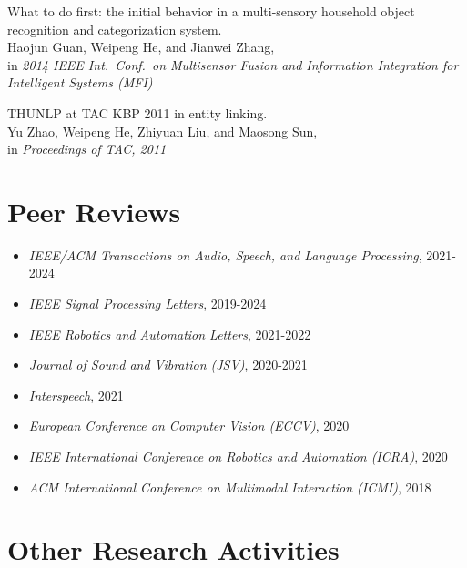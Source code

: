 \documentclass[a4paper,9pt]{extarticle} %
\begin{document}
\begin{enumerate}[label={[\arabic*]}]
  \item What to do first: the initial behavior in a multi-sensory household object recognition and categorization system. \\
        Haojun Guan, Weipeng He, and Jianwei Zhang, \\
        in \textit{2014 IEEE Int.\ Conf.\ on Multisensor Fusion and Information Integration for Intelligent Systems (MFI)}

  \item THUNLP at TAC KBP 2011 in entity linking. \\
        Yu Zhao, Weipeng He, Zhiyuan Liu, and Maosong Sun, \\
        in \textit{Proceedings of TAC, 2011}
\end{enumerate}


\section{Peer Reviews}

\begin{itemize}[itemsep=-.9em]
  \item \textit{IEEE/ACM Transactions on Audio, Speech, and Language Processing}, 2021-2024
  \item \textit{IEEE Signal Processing Letters}, 2019-2024
  \item \textit{IEEE Robotics and Automation Letters}, 2021-2022
  \item \textit{Journal of Sound and Vibration (JSV)}, 2020-2021
  \item \textit{Interspeech}, 2021
  \item \textit{European Conference on Computer Vision (ECCV)}, 2020
  \item \textit{IEEE International Conference on Robotics and Automation (ICRA)}, 2020
  \item \textit{ACM International Conference on Multimodal Interaction (ICMI)}, 2018
\end{itemize}


\section{Other Research Activities}
\end{document}
